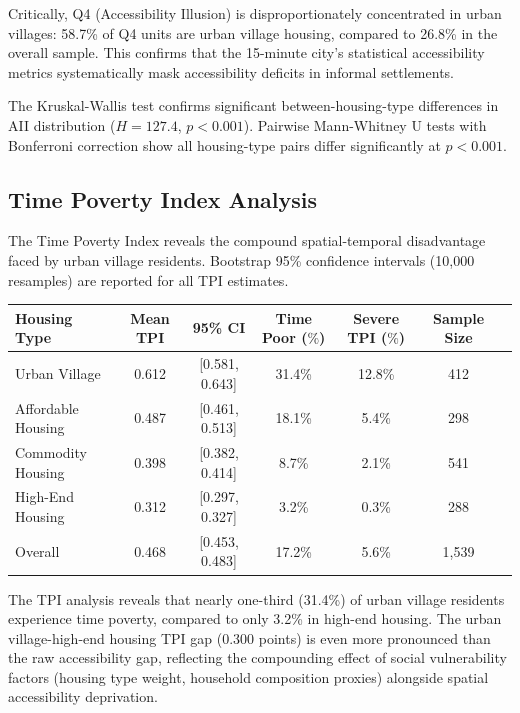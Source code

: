 \documentclass[preprint,12pt,authoryear]{elsarticle}
\begin{document}
Critically, Q4 (Accessibility Illusion) is disproportionately concentrated in urban villages: 58.7\% of Q4 units are urban village housing, compared to 26.8\% in the overall sample. This confirms that the 15-minute city's statistical accessibility metrics systematically mask accessibility deficits in informal settlements.

The Kruskal-Wallis test confirms significant between-housing-type differences in AII distribution ($H = 127.4$, $p < 0.001$). Pairwise Mann-Whitney U tests with Bonferroni correction show all housing-type pairs differ significantly at $p < 0.001$.

\subsection{Time Poverty Index Analysis}
\label{sec:tpi_results}

The Time Poverty Index reveals the compound spatial-temporal disadvantage faced by urban village residents. Bootstrap 95\% confidence intervals (10,000 resamples) are reported for all TPI estimates.

\begin{threeparttable}
\caption{Time Poverty Index (TPI) Results by Housing Type}
\label{tab:tpi_results}
\begin{tabular}{lcccccc}
\toprule
Housing Type & Mean TPI & 95\% CI & Time Poor ($\%$) & Severe TPI ($\%$) & Sample Size \\
\midrule
Urban Village & 0.612 & [0.581, 0.643] & 31.4\% & 12.8\% & 412 \\
Affordable Housing & 0.487 & [0.461, 0.513] & 18.1\% & 5.4\% & 298 \\
Commodity Housing & 0.398 & [0.382, 0.414] & 8.7\% & 2.1\% & 541 \\
High-End Housing & 0.312 & [0.297, 0.327] & 3.2\% & 0.3\% & 288 \\
\midrule
Overall & 0.468 & [0.453, 0.483] & 17.2\% & 5.6\% & 1,539 \\
\bottomrule
\end{tabular}
\end{threeparttable}

The TPI analysis reveals that nearly one-third (31.4\%) of urban village residents experience time poverty, compared to only 3.2\% in high-end housing. The urban village-high-end housing TPI gap (0.300 points) is even more pronounced than the raw accessibility gap, reflecting the compounding effect of social vulnerability factors (housing type weight, household composition proxies) alongside spatial accessibility deprivation.
\end{document}
